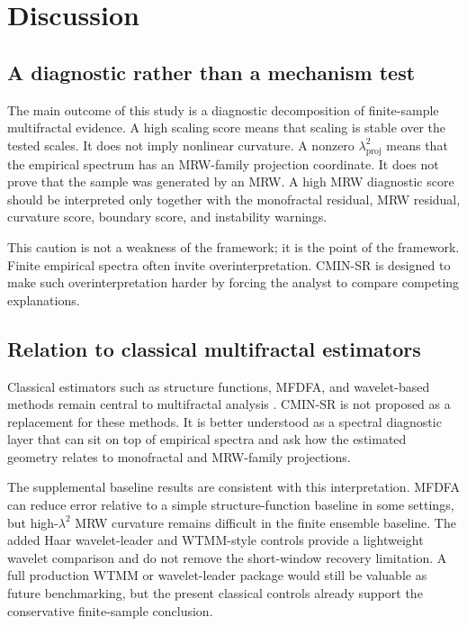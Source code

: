 \section{Discussion}

\subsection{A diagnostic rather than a mechanism test}

The main outcome of this study is a diagnostic decomposition of finite-sample
multifractal evidence. A high scaling score means that scaling is stable over
the tested scales. It does not imply nonlinear curvature. A nonzero
\(\lambda^2_{\mathrm{proj}}\) means that the empirical spectrum has an
MRW-family projection coordinate. It does not prove that the sample was generated
by an MRW. A high MRW diagnostic score should be interpreted only together
with the monofractal residual, MRW residual, curvature score, boundary score,
and instability warnings.

This caution is not a weakness of the framework; it is the point of the
framework. Finite empirical spectra often invite overinterpretation. CMIN-SR
is designed to make such overinterpretation harder by forcing the analyst to
compare competing explanations.

\subsection{Relation to classical multifractal estimators}

Classical estimators such as structure functions, MFDFA, and wavelet-based
methods remain central to multifractal analysis
\cite{muzy1991wavelets,muzy1993multifractal,kantelhardt2002mfdfa,jaffard2007wavelet,wendt2007bootstrap}.
CMIN-SR is
not proposed as a replacement for these methods. It is better understood as a
spectral diagnostic layer that can sit on top of empirical spectra and ask how
the estimated geometry relates to monofractal and MRW-family projections.

The supplemental baseline results are consistent with this interpretation.
MFDFA can reduce error relative to a simple structure-function baseline in
some settings, but high-\(\lambda^2\) MRW curvature remains difficult in the
finite ensemble baseline. The added Haar wavelet-leader and WTMM-style
controls provide a lightweight wavelet comparison and do not remove the
short-window recovery limitation. A full production WTMM or wavelet-leader
package would still be valuable as future benchmarking, but the present
classical controls already support the conservative finite-sample conclusion.

